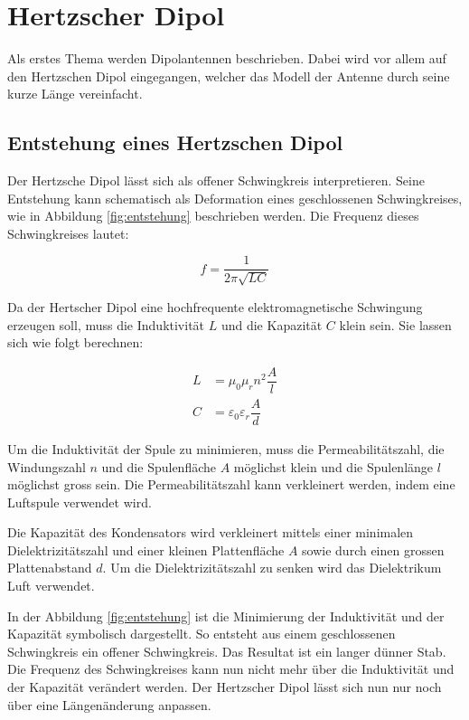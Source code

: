 \section{Hertzscher Dipol}\label{sec:HerDip}


Als erstes Thema werden Dipolantennen beschrieben. Dabei wird vor allem auf den Hertzschen Dipol eingegangen, welcher das Modell der Antenne durch seine kurze Länge vereinfacht.

\subsection{Entstehung eines Hertzschen Dipol}\label{sec:entstehung}
Der Hertzsche Dipol lässt sich als offener Schwingkreis interpretieren. Seine Entstehung kann schematisch als Deformation eines geschlossenen Schwingkreises, wie in Abbildung \ref{fig:entstehung} beschrieben werden. Die Frequenz dieses Schwingkreises lautet:

\begin{equation}
f = \dfrac{1}{2 \pi \sqrt{LC}}
\end{equation} 

Da der Hertscher Dipol eine hochfrequente elektromagnetische Schwingung erzeugen soll, muss die Induktivität $ L $ und die Kapazität $ C $ klein sein. Sie lassen sich wie folgt berechnen:

\begin{align}
L &= \mu_0  \mu_r  n^{2} \dfrac{A}{l} \\
C &= \varepsilon_0  \varepsilon_r   \dfrac{A}{d}
\label{eq:LC}
\end{align}

Um die Induktivität der Spule zu minimieren, muss die Permeabilitätszahl, die Windungszahl $ n $ und die Spulenfläche $ A $ möglichst klein und die Spulenlänge $ l $ möglichst gross sein. Die Permeabilitätszahl kann verkleinert werden, indem eine Luftspule verwendet wird.

Die Kapazität des Kondensators wird verkleinert mittels einer minimalen Dielektrizitätszahl und einer kleinen Plattenfläche $ A $ sowie durch einen grossen Plattenabstand $ d $. Um die Dielektrizitätszahl zu senken wird das Dielektrikum Luft verwendet.

In der Abbildung \ref{fig:entstehung} ist die Minimierung der Induktivität und der Kapazität symbolisch dargestellt. So entsteht aus einem geschlossenen Schwingkreis ein offener Schwingkreis. Das Resultat ist ein langer dünner Stab. Die Frequenz des Schwingkreises kann nun nicht mehr über die Induktivität und der Kapazität verändert werden. Der Hertzscher Dipol lässt sich nun nur noch über eine Längenänderung anpassen.

